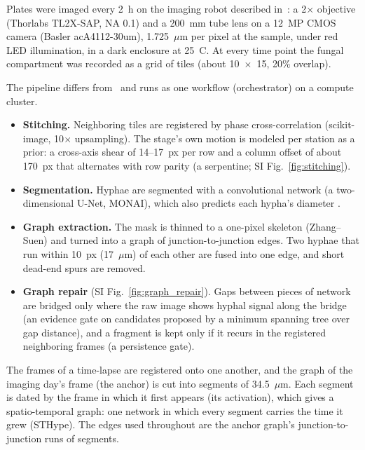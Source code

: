 Plates were imaged every 2~h on the imaging robot described in~\cite{oyarte_galvez_travelling-wave_2025}: a 2$\times$ objective (Thorlabs TL2X-SAP, NA 0.1) and a 200~mm tube lens on a 12~MP CMOS camera (Basler acA4112-30um), 1.725~$\mu$m per pixel at the sample, under red LED illumination, in a dark enclosure at 25~\textdegree C. At every time point the fungal compartment was recorded as a grid of tiles (about 10~$\times$~15, 20\% overlap).


The pipeline differs from~\cite{oyarte_galvez_travelling-wave_2025} and runs as one workflow (orchestrator) on a compute cluster.
\begin{itemize}
  \item \textbf{Stitching.}
Neighboring tiles are registered by phase cross-correlation (scikit-image, 10$\times$ upsampling).
The stage's own motion is modeled per station as a prior: a cross-axis shear of 14--17~px per row and a column offset of about 170~px that alternates with row parity (a serpentine; SI Fig.~\ref{fig:stitching}).
  \item \textbf{Segmentation.}
Hyphae are segmented with a convolutional network (a two-dimensional U-Net, MONAI), which also predicts each hypha's diameter .
  \item \textbf{Graph extraction.}
The mask is thinned to a one-pixel skeleton (Zhang--Suen) and turned into a graph of junction-to-junction edges.
Two hyphae that run within 10~px (17~$\mu$m) of each other are fused into one edge, and short dead-end spurs are removed.
  \item \textbf{Graph repair} (SI Fig.~\ref{fig:graph_repair}).
Gaps between pieces of network are bridged only where the raw image shows hyphal signal along the bridge (an evidence gate on candidates proposed by a minimum spanning tree over gap distance), and a fragment is kept only if it recurs in the registered neighboring frames (a persistence gate).
\end{itemize}


The frames of a time-lapse are registered onto one another, and the graph of the imaging day's frame (the anchor) is cut into segments of 34.5~$\mu$m.
Each segment is dated by the frame in which it first appears (its activation), which gives a spatio-temporal graph: one network in which every segment carries the time it grew (STHype).
The edges used throughout are the anchor graph's junction-to-junction runs of segments.

